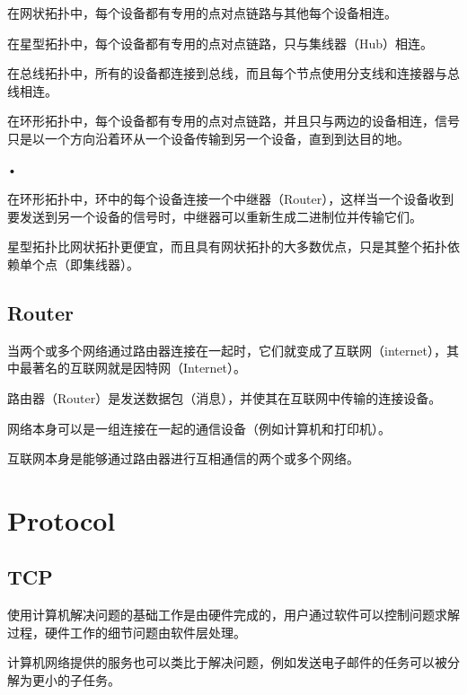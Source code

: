 \begin{compactitem}
\item 在网状拓扑中，每个设备都有专用的点对点链路与其他每个设备相连。
\item 在星型拓扑中，每个设备都有专用的点对点链路，只与集线器（Hub）相连。
\item 在总线拓扑中，所有的设备都连接到总线，而且每个节点使用分支线和连接器与总线相连。
\item 在环形拓扑中，每个设备都有专用的点对点链路，并且只与两边的设备相连，信号只是以一个方向沿着环从一个设备传输到另一个设备，直到到达目的地。
\end{compactitem}•

在环形拓扑中，环中的每个设备连接一个中继器（Router），这样当一个设备收到要发送到另一个设备的信号时，中继器可以重新生成二进制位并传输它们。

星型拓扑比网状拓扑更便宜，而且具有网状拓扑的大多数优点，只是其整个拓扑依赖单个点（即集线器）。

\section{Router}



当两个或多个网络通过路由器连接在一起时，它们就变成了互联网（internet），其中最著名的互联网就是因特网（Internet）。

路由器（Router）是发送数据包（消息），并使其在互联网中传输的连接设备。

\begin{compactitem}
\item 网络本身可以是一组连接在一起的通信设备（例如计算机和打印机）。
\item 互联网本身是能够通过路由器进行互相通信的两个或多个网络。
\end{compactitem}

\chapter{Protocol}


\section{TCP}


使用计算机解决问题的基础工作是由硬件完成的，用户通过软件可以控制问题求解过程，硬件工作的细节问题由软件层处理。

计算机网络提供的服务也可以类比于解决问题，例如发送电子邮件的任务可以被分解为更小的子任务。

